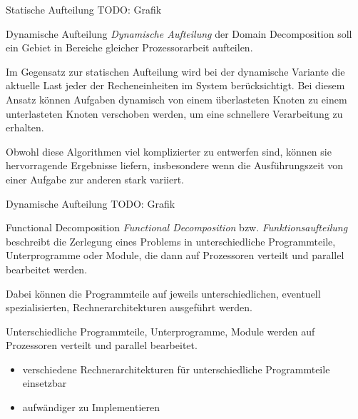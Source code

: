 \begin{example}{Statische Aufteilung}
    TODO: Grafik
\end{example}

\begin{defi}{Dynamische Aufteilung}
    \emph{Dynamische Aufteilung} der Domain Decomposition soll ein Gebiet in Bereiche gleicher Prozessorarbeit aufteilen.

    Im Gegensatz zur statischen Aufteilung wird bei der dynamische Variante die aktuelle Last jeder der Recheneinheiten im System berücksichtigt.
    Bei diesem Ansatz können Aufgaben dynamisch von einem überlasteten Knoten zu einem unterlasteten Knoten verschoben werden, um eine schnellere Verarbeitung zu erhalten.

    Obwohl diese Algorithmen viel komplizierter zu entwerfen sind, können sie hervorragende Ergebnisse liefern, insbesondere wenn die Ausführungszeit von einer Aufgabe zur anderen stark variiert.

\end{defi}

\begin{example}{Dynamische Aufteilung}
    TODO: Grafik
\end{example}

\begin{defi}{Functional Decomposition}
    \emph{Functional Decomposition} bzw. \emph{Funktionsaufteilung} beschreibt die Zerlegung eines Problems in unterschiedliche Programmteile, Unterprogramme oder Module, die dann auf Prozessoren verteilt und parallel bearbeitet werden.

    Dabei können die Programmteile auf jeweils unterschiedlichen, eventuell spezialisierten, Rechnerarchitekturen ausgeführt werden.

    Unterschiedliche Programmteile, Unterprogramme,
    Module werden auf Prozessoren verteilt und parallel bearbeitet.
    \begin{itemize}[$\to$]
        \item verschiedene Rechnerarchitekturen für unterschiedliche Programmteile einsetzbar
        \item aufwändiger zu Implementieren
    \end{itemize}
\end{defi}


